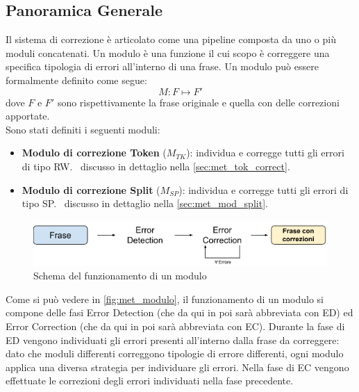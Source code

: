 \subsection{Panoramica Generale}
\label{sec:met_panoramica}
Il sistema di correzione è articolato come una pipeline composta da uno o più moduli 	concatenati. Un modulo è una funzione il cui scopo è correggere una specifica tipologia di errori all'interno di una frase. Un modulo può essere formalmente definito come segue:
\begin{equation}
M: F \mapsto F\prime
\end{equation}
dove $F$ e $F\prime$ sono rispettivamente la frase originale e quella con delle correzioni apportate. \\
Sono stati definiti i seguenti moduli:
\begin{itemize}
\item \textbf{Modulo di correzione Token} ($M_{TK}$): individua e corregge tutti gli errori di tipo RW. \E\ discusso in dettaglio nella \autoref{sec:met_tok_correct}.
\item \textbf{Modulo di correzione Split} ($M_{SP}$): individua e corregge tutti gli errori di tipo SP. \E\ discusso in dettaglio nella \autoref{sec:met_mod_split}.
\end{itemize}

\begin{figure}[H]
\centering
\includegraphics[width=\textwidth]{immagini/metodologia/modulo}
\caption{Schema del funzionamento di un modulo}
\label{fig:met_modulo}
\end{figure}

Come si può vedere in \autoref{fig:met_modulo}, il funzionamento di un modulo si compone delle fasi Error Detection (che da qui in poi sarà abbreviata con ED) ed Error Correction (che da qui in poi sarà abbreviata con EC). Durante la fase di ED vengono individuati gli errori presenti all'interno dalla frase da correggere: dato che moduli differenti correggono tipologie di errore differenti, ogni modulo applica una diversa strategia per individuare gli errori. Nella fase di EC vengono effettuate le correzioni degli errori individuati nella fase precedente.

